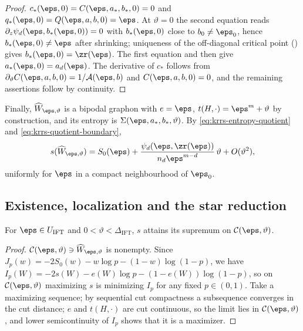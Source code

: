 \begin{proof}
$c_*(\eps,0)=C(\eps,a_*,b_*,0)=0$ and $q_*(\eps,0)=Q(\eps,a,b,0)=\eps$.
At $\vartheta=0$ the second equation reads $\partial_z\psi_d(\eps,b_*(\eps,0))=0$
with $b_*(\eps,0)$ close to $b_0\ne\eps_0$, hence $b_*(\eps,0)\ne\eps$ after
shrinking; uniqueness of the off-diagonal critical point
() gives $b_*(\eps,0)=\zr(\eps)$.  The first
equation and  then give $a_*(\eps,0)=a_d(\eps)$.
The derivative of $c_*$ follows from $\partial_\vartheta C(\eps,a,b,0)
=1/\mathcal A(\eps,b)$ and $C(\eps,a,b,0)=0$, and the remaining assertions
follow by continuity.
\end{proof}

Finally, $\widehat W_{\eps,\vartheta}$ is a bipodal graphon with
$e=\eps$, $t(H,\cdot)=\eps^m+\vartheta$ by construction, and its entropy is
$\Sigma(\eps,a_*,b_*,\vartheta)$.  By \eqref{eq:krrs-entropy-quotient} and
\eqref{eq:krrs-quotient-boundary},
\begin{equation}\label{kb:eq:family-entropy}
  s(\widehat W_{\eps,\vartheta})
  =S_0(\eps)+\frac{\psi_d(\eps,\zr(\eps))}{n_d\eps^{m-d}}\,\vartheta
   +O(\vartheta^2),
\end{equation}
uniformly for $\eps$ in a compact neighbourhood of $\eps_0$.

\subsection{Existence, localization and the star reduction}
\label{kb:sec:local}

\begin{lemma}[Existence]\label{kb:lem:exists}
For $\eps\in U_{\mathrm{IFT}}$ and $0<\vartheta<\Delta_{\mathrm{IFT}}$,
$s$ attains its supremum on $\mathcal C(\eps,\vartheta)$.
\end{lemma}

\begin{proof}
$\mathcal C(\eps,\vartheta)\ni\widehat W_{\eps,\vartheta}$ is nonempty.
Since $J_p(w)=-2S_0(w)-w\log p-(1-w)\log(1-p)$, we have
$I_p(W)=-2s(W)-e(W)\log p-(1-e(W))\log(1-p)$, so on
$\mathcal C(\eps,\vartheta)$ maximizing $s$ is minimizing $I_p$ for any
fixed $p\in(0,1)$.  Take a maximizing sequence; by sequential cut
compactness a subsequence converges in the cut distance; $e$ and
$t(H,\cdot)$ are cut continuous, so the limit lies in
$\mathcal C(\eps,\vartheta)$, and lower semicontinuity of $I_p$ shows that
it is a maximizer.
\end{proof}

